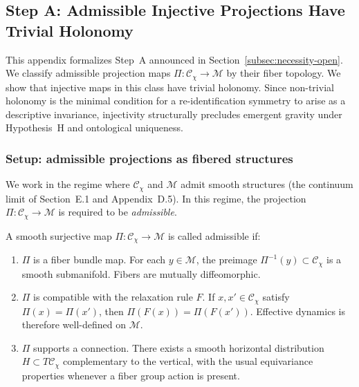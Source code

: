 \subsection{Step A: Admissible Injective Projections Have Trivial Holonomy}
  \label{sec:stepA-injective-holonomy}

  This appendix formalizes Step~A announced in Section~\ref{subsec:necessity-open}.
  We classify admissible projection maps $\Pi : \mathcal{C}_\chi \to \mathcal{M}$ by their fiber topology.
  We show that injective maps in this class have trivial holonomy.
  Since non-trivial holonomy is the minimal condition for a re-identification symmetry to arise as a descriptive invariance,
  injectivity structurally precludes emergent gravity under Hypothesis~H and ontological uniqueness.

  \subsubsection*{Setup: admissible projections as fibered structures}
    \label{subsec:stepA-setup}

    We work in the regime where $\mathcal{C}_\chi$ and $\mathcal{M}$ admit smooth structures
    (the continuum limit of Section~E.1 and Appendix~D.5).
    In this regime, the projection $\Pi : \mathcal{C}_\chi \to \mathcal{M}$ is required to be \emph{admissible}.

    \begin{definition}
      \label{def:admissible-projection}
      A smooth surjective map $\Pi : \mathcal{C}_\chi \to \mathcal{M}$ is called admissible if:
      \begin{enumerate}[label=(A\arabic*)]
  \item \label{A1}
  $\Pi$ is a fiber bundle map.
  For each $y \in \mathcal{M}$, the preimage $\Pi^{-1}(y) \subset \mathcal{C}_\chi$ is a smooth submanifold.
  Fibers are mutually diffeomorphic.
  \item \label{A2}
  $\Pi$ is compatible with the relaxation rule $F$.
  If $x, x' \in \mathcal{C}_\chi$ satisfy $\Pi(x) = \Pi(x')$, then $\Pi(F(x)) = \Pi(F(x'))$.
  Effective dynamics is therefore well-defined on $\mathcal{M}$.
  \item \label{A3}
  $\Pi$ supports a connection.
  There exists a smooth horizontal distribution $H \subset T\mathcal{C}_\chi$ complementary to the vertical,
  with the usual equivariance properties whenever a fiber group action is present.
      \end{enumerate}
    \end{definition}

